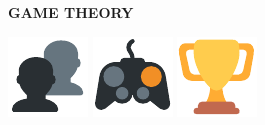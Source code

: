 \documentclass{beamer}
\begin{document}
\begin{frame}
    \centering
    \Large \textbf{GAME THEORY}
\end{frame}

\begin{frame}
    \centering
    \includegraphics[width=.2\textwidth]{static/players} \hspace{.6cm}
    \includegraphics[width=.2\textwidth]{static/actions} \hspace{.6cm}
    \includegraphics[width=.2\textwidth]{static/objective}
\end{frame}
\end{document}
